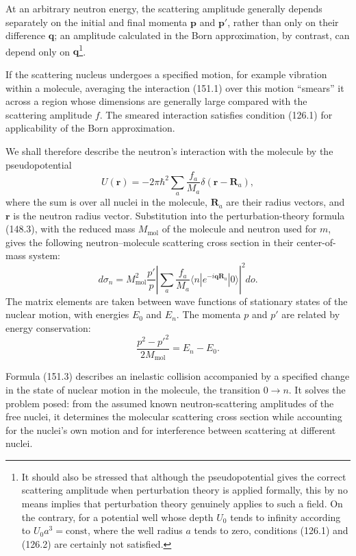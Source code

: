 At an arbitrary neutron energy, the scattering amplitude generally depends separately on the initial and final momenta $\mathbf p$ and $\mathbf p'$, rather than only on their difference $\mathbf q$; an amplitude calculated in the Born approximation, by contrast, can depend only on $\mathbf q$\footnote{It should also be stressed that although the pseudopotential gives the correct scattering amplitude when perturbation theory is applied formally, this by no means implies that perturbation theory genuinely applies to such a field. On the contrary, for a potential well whose depth $U_0$ tends to infinity according to $U_0a^3=\mathrm{const}$, where the well radius $a$ tends to zero, conditions (126.1) and (126.2) are certainly not satisfied.}.

If the scattering nucleus undergoes a specified motion, for example vibration within a molecule, averaging the interaction (151.1) over this motion ``smears'' it across a region whose dimensions are generally large compared with the scattering amplitude $f$. The smeared interaction satisfies condition (126.1) for applicability of the Born approximation.

We shall therefore describe the neutron's interaction with the molecule by the pseudopotential
\begin{equation}
 U(\mathbf r)=-2\pi\hbar^2\sum_a\frac{f_a}{M_a}\delta(\mathbf r-\mathbf R_a),
 \tag{151.2}
\end{equation}
where the sum is over all nuclei in the molecule, $\mathbf R_a$ are their radius vectors, and $\mathbf r$ is the neutron radius vector. Substitution into the perturbation-theory formula (148.3), with the reduced mass $M_\text{mol}$ of the molecule and neutron used for $m$, gives the following neutron--molecule scattering cross section in their center-of-mass system:
\begin{equation}
 d\sigma_n=M_\text{mol}^2\frac{p'}p
 \left|\sum_a\frac{f_a}{M_a}\langle n|e^{-i\mathbf q\mathbf R_a}|0\rangle\right|^2do.
 \tag{151.3}
\end{equation}
The matrix elements are taken between wave functions of stationary states of the nuclear motion, with energies $E_0$ and $E_n$. The momenta $p$ and $p'$ are related by energy conservation:
\[
 \frac{p^2-p'^2}{2M_\text{mol}}=E_n-E_0.
\]

Formula (151.3) describes an inelastic collision accompanied by a specified change in the state of nuclear motion in the molecule, the transition $0\longrightarrow n$. It solves the problem posed: from the assumed known neutron-scattering amplitudes of the free nuclei, it determines the molecular scattering cross section while accounting for the nuclei's own motion and for interference between scattering at different nuclei.

